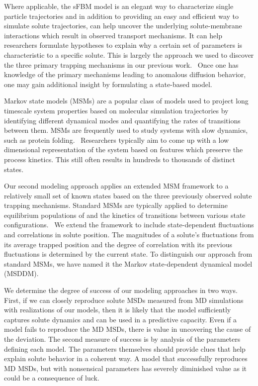 \documentclass{article}
\begin{document}
  Where applicable, the sFBM model is an elegant way to characterize single 
  particle trajectories and in addition to providing an easy and efficient way to 
  simulate solute trajectories, can help uncover the underlying solute-membrane
  interactions which result in observed transport mechanisms. It can help 
  researchers formulate hypotheses to explain why a certain set of parameters is
  characteristic to a specific solute. This is largely the approach we used to
  discover the three primary trapping mechanisms in our previous work.~\cite{coscia_chemically_2019}
  Once one has knowledge of the primary mechanisms leading to anomalous diffusion
  behavior, one may gain additional insight by formulating a state-based model.

  Markov state models (MSMs) are a popular class of models used to project long timescale
  system properties based on molecular simulation trajectories by identifying
  different dynamical modes and quantifying the rates of transitions between them.
  MSMs are frequently used to study systems with slow dynamics, such as protein 
  folding.~\cite{snow_how_2005,chodera_automatic_2007} Researchers typically aim to 
  come up with a low dimensional representation of the system based on features 
  which preserve the process kinetics. This still often results in hundreds to thousands
  of distinct states.~\cite{chodera_markov_2014}

  Our second modeling approach applies an extended MSM framework to a relatively 
  small set of known states based on the three previously observed solute trapping mechanisms.  
  Standard MSMs are typically applied to determine equilibrium populations
  of and the kinetics of transitions between various state configurations.~\cite{bowman_using_2009} 
  We extend the framework to include state-dependent fluctuations and correlations in 
  solute position. The magnitudes of a solute's fluctuations from its average trapped 
  position and the degree of correlation with its previous fluctuations is 
  determined by the current state. To distinguish our approach from standard MSMs, we have
  named it the Markov state-dependent dynamical model (MSDDM).
  
  We determine the degree of success of our modeling approaches in two ways. First,
  if we can closely reproduce solute MSDs measured from MD simulations with realizations
  of our models, then it is likely that the model sufficiently captures solute 
  dynamics and can be used in a predictive capacity. Even if a model fails to 
  reproduce the MD MSDs, there is value in uncovering the cause of the deviation.
  The second measure of success is by analysis of the parameters defining each 
  model. The parameters themselves should provide clues that help explain solute 
  behavior in a coherent way. A model that successfully reproduces MD MSDs, but 
  with nonsensical parameters has severely diminished value as it could be a 
  consequence of luck.
  
\end{document}
